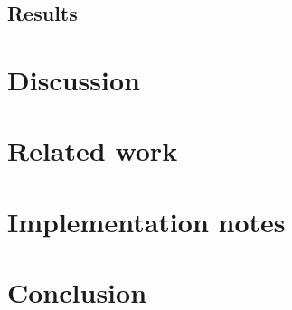 \documentclass{article} %
\begin{document}
\subsection{Results}

\section{Discussion}

\section{Related work}

\section{Implementation notes}

\section{Conclusion}



\end{document}
